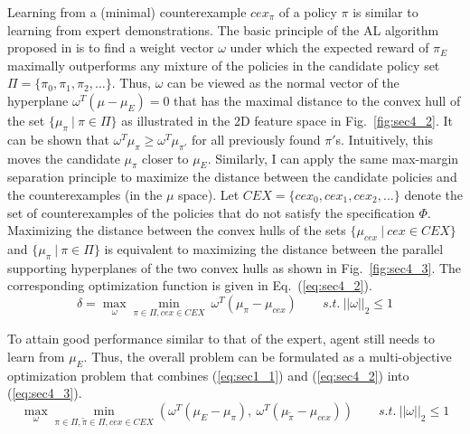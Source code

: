 Learning from a (minimal) counterexample $cex_{\pi}$ of a policy $\pi$ is similar to learning from expert demonstrations. %
The basic principle of the AL algorithm proposed in \cite{Abbeel:2004:ALV:1015330.1015430} is to find a weight vector $\omega$ under which the expected reward of $\pi_E$ maximally outperforms any mixture of the policies in the candidate policy set $\Pi=\{\pi_0, \pi_1, \pi_2, \ldots\}$. Thus, $\omega$ can be viewed as the normal vector of the hyperplane $\omega^T(\mu - \mu_E) = 0$ that has the maximal distance to the convex hull of the set $\{\mu_{\pi}\:|\:\pi\in\Pi\}$ as illustrated in the 2D feature space in Fig.~\ref{fig:sec4_2}. 
It can be shown that $\omega^T \mu_\pi \geq \omega^T \mu_{\pi'}$ for all previously found $\pi'$s. Intuitively, this moves the candidate $\mu_\pi$ closer to $\mu_E$.
Similarly, I can apply the same max-margin separation principle to maximize the distance between the candidate policies and the counterexamples (in the $\mu$ space).     
Let ${CEX}= \{cex_0, cex_1, cex_2, ...\}$ denote the set of counterexamples of the policies that do not satisfy the specification $\Phi$. 
Maximizing the distance between the convex hulls of the sets $\{\mu_{cex}\:|\:cex\in{CEX}\}$ and $\{\mu_{\pi}\:|\:\pi\in\Pi\}$ is equivalent to maximizing the distance between the parallel supporting hyperplanes of the two convex hulls as shown in Fig.~\ref{fig:sec4_3}. The corresponding optimization function is given in Eq.~(\ref{eq:sec4_2}).
\begin{equation}
\delta = \max\limits_{\omega}\min\limits_{\pi\in\Pi, cex\in CEX}\ \omega^T(\mu_{\pi}-\mu_{cex})\label{eq:sec4_2}\qquad s.t.\:||\omega||_2\leq 1
\end{equation}

To attain good performance similar to that of the expert, agent still needs to learn from $\mu_E$. Thus, the overall problem can be formulated as a multi-objective optimization problem that combines (\ref{eq:sec1_1}) and (\ref{eq:sec4_2}) into (\ref{eq:sec4_3}).
\begin{equation}
\max\limits_\omega \min\limits_{\pi \in \Pi, \tilde\pi \in \Pi, cex \in CEX} (\omega^T (\mu_E - \mu_{\pi}),\ \omega^T (\mu_{\tilde\pi} - \mu_{cex}) )\qquad s.t.\:||\omega||_2\leq 1
\label{eq:sec4_3}
\end{equation}
